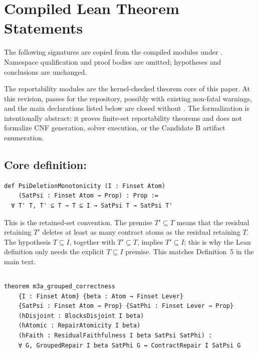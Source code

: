 \section{Compiled Lean Theorem Statements}
\label{app:lean}

The following signatures are copied from the compiled modules under
.  Namespace qualification and proof
bodies are omitted; hypotheses and conclusions are unchanged.

The reportability modules are the kernel-checked theorem core of this paper.
At this revision,  passes for the repository, possibly with
existing non-fatal warnings, and the main declarations listed below are
closed without .  The formalization is intentionally abstract: it
proves finite-set reportability theorems and does not formalize CNF generation,
solver execution, or the Candidate B artifact enumeration.

\subsection{Core definition: }
\begin{Verbatim}[fontsize=\scriptsize]
def PsiDeletionMonotonicity (I : Finset Atom)
    (SatPsi : Finset Atom → Prop) : Prop :=
  ∀ T' T, T' ⊆ T → T ⊆ I → SatPsi T → SatPsi T'
\end{Verbatim}

This is the retained-set convention.  The premise \(T' \subseteq T\) means
that the residual retaining \(T'\) deletes at least as many contract atoms as
the residual retaining \(T\).  The hypothesis \(T \subseteq I\), together with
\(T' \subseteq T\), implies \(T' \subseteq I\); this is why the Lean definition
only needs the explicit \(T \subseteq I\) premise.  This matches Definition~5
in the main text.

\subsection{}
\begin{Verbatim}[fontsize=\scriptsize]
theorem m3a_grouped_correctness
    {I : Finset Atom} {beta : Atom → Finset Lever}
    {SatPsi : Finset Atom → Prop} {SatPhi : Finset Lever → Prop}
    (hDisjoint : BlocksDisjoint I beta)
    (hAtomic : RepairAtomicity I beta)
    (hFaith : ResidualFaithfulness I beta SatPsi SatPhi) :
    ∀ G, GroupedRepair I beta SatPhi G ↔ ContractRepair I SatPsi G
\end{Verbatim}


